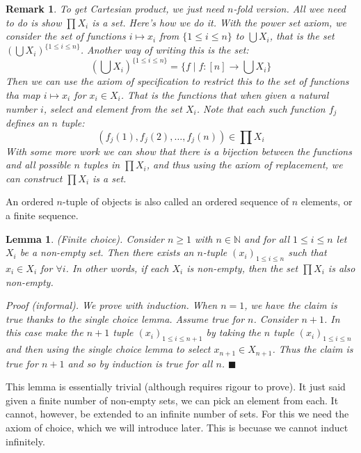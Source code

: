 \documentclass{article}
\newtheorem{remark}{Remark}[subsection]
\newtheorem{lemma}{Lemma}[subsection]
\newcommand{\N}{\mathbb{N}}
\let\it\textit
\begin{document}
\begin{remark}
	To get Cartesian product, we just need $n$-fold version. 
	All wee need to do is show $\prod X_i$ is a set. Here's 
	how we do it. With the power set axiom, we consider the set 
	of functions $i \mapsto x_i$ from $\{ 1 \leq i \leq n\}$ to 
	$\bigcup X_i$, that is the set $(\bigcup X_i)^{\{ 1 \leq i \leq n\}}$.
	Another way of writing this is the set: 
	$$
	(\bigcup X_i)^{\{ 1 \leq i \leq n\}} = \{ f\mid f: [n] \to \bigcup X_i\}
	$$
	Then we can use the axiom of specification to restrict this to 
	the set of functions tha map $i \mapsto x_i$ for $x_i \in X_i$. 
	That is the functions that when given a natural number $i$, select 
	and element from the set $X_i$. Note that each such function $f_j$ defines
	an $n$ tuple:
	$$
	(f_j(1), f_j(2), \dots, f_j(n)) \in \prod X_i
	$$
	With some more work we can show that there is a bijection between 
	the functions and all possible $n$ tuples in $\prod X_i$, and thus
	using the axiom of replacement, we can construct $\prod X_i$ is a set.
\end{remark}

An ordered $n$-tuple of objects is also called an ordered sequence of
$n$ elements, or a finite sequence.

\begin{lemma}
	(Finite choice). Consider $n \geq 1$ with $n \in \N$ and for all 
	$1 \leq i \leq n$ let $X_i$ be a non-empty set. Then there exists
	an $n$-tuple $(x_i)_{1 \leq i \leq n}$ such that $x_i \in X_i$ for
	$\forall i$. In other words, if each $X_i$ is non-empty, then 
	the set $\prod X_i$ is also non-empty.

	\it{Proof} (informal). We prove with induction. When $n=1$, we
	have the claim is true thanks to the \it{single choice lemma}. 
	Assume true for $n$. Consider $n +1$. In this case make the 
	$n+1$ tuple $(x_i)_{1 \leq i \leq n+1}$ by taking the $n$ tuple
	$(x_i)_{1 \leq i \leq n}$ and then using the single choice lemma
	to select $x_{n+1} \in X_{n+1}$. Thus the claim is true for
	$n+1$ and so by induction is true for all $n$. \hfill $\blacksquare$
\end{lemma}

This lemma is essentially trivial (although requires rigour to prove). 
It just said given a finite number of non-empty sets, we can pick
an element from each. It cannot, however, be extended to 
an infinite number of sets. For this we need the axiom of choice, which 
we will introduce later.
This is becuase we cannot induct infinitely.
\end{document}
